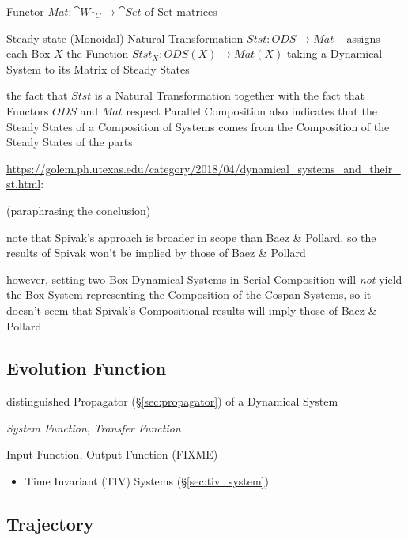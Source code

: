 Functor $Mat : \cat{W}_{\cat{C}} \rightarrow \cat{Set}$ of Set-matrices

Steady-state (Monoidal) Natural Transformation $Stst : ODS \rightarrow Mat$ --
assigns each Box $X$ the Function $Stst_X : ODS(X) \rightarrow Mat(X)$ taking a
Dynamical System to its Matrix of Steady States

the fact that $Stst$ is a Natural Transformation together with the fact that
Functors $ODS$ and $Mat$ respect Parallel Composition also indicates that the
Steady States of a Composition of Systems comes from the Composition of the
Steady States of the parts

\url{https://golem.ph.utexas.edu/category/2018/04/dynamical_systems_and_their_st.html}:

(paraphrasing the conclusion)

note that Spivak's approach is broader in scope than Baez \& Pollard, so the
results of Spivak won't be implied by those of Baez \& Pollard

however, setting two Box Dynamical Systems in Serial Composition will
\emph{not} yield the Box System representing the Composition of the Cospan
Systems, so it doesn't seem that Spivak's Compositional results will imply
those of Baez \& Pollard



\subsection{Evolution Function}\label{sec:evolution_function}

distinguished Propagator (\S\ref{sec:propagator}) of a Dynamical System

\emph{System Function}, \emph{Transfer Function}

\fist Input Function, Output Function (FIXME)

\begin{itemize}
  \item Time Invariant (TIV) Systems (\S\ref{sec:tiv_system})
\end{itemize}



\subsection{Trajectory}\label{sec:trajectory}

